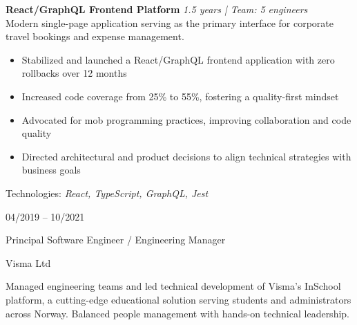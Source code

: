 \documentclass[9pt]{developercv} %
\newif\ifmanager
\begin{document}
\begin{entrylist}
{        \textbf{React/GraphQL Frontend Platform} \hfill \textit{1.5 years | Team: 5 engineers}\\
        Modern single-page application serving as the primary interface for corporate travel bookings and expense management.
        \begin{itemize}[noitemsep,topsep=0pt,parsep=0pt,partopsep=0pt, leftmargin=15pt]
                \ifmanager
                    \item Led team to stabilize and launch React/GraphQL frontend with zero rollbacks over 12 months through disciplined release management
                    \item Drove code coverage improvement from 25\% to 55\%, establishing quality standards and fostering a quality-first culture
                    \item Championed mob programming practices to improve team collaboration, knowledge sharing, and collective code ownership
                    \item Aligned architectural and product decisions with business goals, serving as primary technical liaison to stakeholders
                \else
                    \item Stabilized and launched a React/GraphQL frontend application with zero rollbacks over 12 months
                    \item Increased code coverage from 25\% to 55\%, fostering a quality-first mindset
                    \item Advocated for mob programming practices, improving collaboration and code quality
                    \item Directed architectural and product decisions to align technical strategies with business goals
                \fi
        \end{itemize}
        \vspace{4pt}
        Technologies: \textit{React, TypeScript, GraphQL, Jest}
        }
        \entry
        {04/2019 -- 10/2021}
        {
            \ifmanager
                Engineering Manager
            \else
                Principal Software Engineer / Engineering Manager
            \fi
        }
        {Visma Ltd}
        {\vspace{-10pt}
        \begin{flushleft}
            \ifmanager
                Managed engineering teams and led technical development of Visma's InSchool platform, a cutting-edge educational solution serving students and administrators across Norway. Balanced people management with hands-on technical leadership.

\end{flushleft}}
\end{entrylist}
\end{document}
